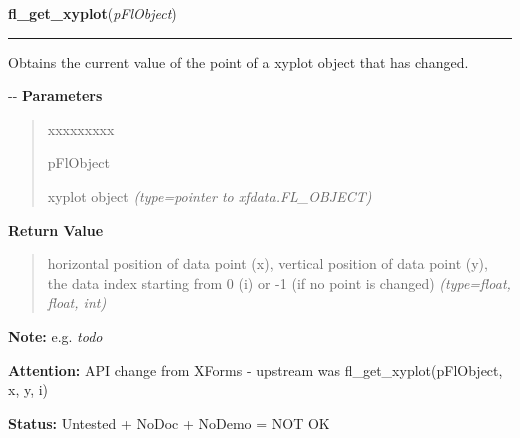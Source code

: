     \vspace{0.5ex}

\hspace{.8\funcindent}\begin{boxedminipage}{\funcwidth}

    \raggedright \textbf{fl\_get\_xyplot}(\textit{pFlObject})

    \vspace{-1.5ex}

    \rule{\textwidth}{0.5\fboxrule}
\setlength{\parskip}{2ex}

Obtains the current value of the point of a xyplot object that has
changed.

-{}-
\setlength{\parskip}{1ex}
      \textbf{Parameters}
      \vspace{-1ex}

      \begin{quote}
        \begin{Ventry}{xxxxxxxxx}

          \item[pFlObject]


xyplot object
            {\it (type=pointer to xfdata.FL\_OBJECT)}

        \end{Ventry}

      \end{quote}

      \textbf{Return Value}
    \vspace{-1ex}

      \begin{quote}

horizontal position of data point (x), vertical position of data
point (y), the data index starting from 0 (i) or -1 (if no point is
changed)
      {\it (type=float, float, int)}

      \end{quote}

\textbf{Note:} 
e.g. \emph{todo}


\textbf{Attention:} 
API change from XForms - upstream was
fl\_get\_xyplot(pFlObject, x, y, i)


\textbf{Status:} 
Untested + NoDoc + NoDemo = NOT OK


    \end{boxedminipage}

    \label{xformslib:flxyplot:fl_get_xyplot_data}

